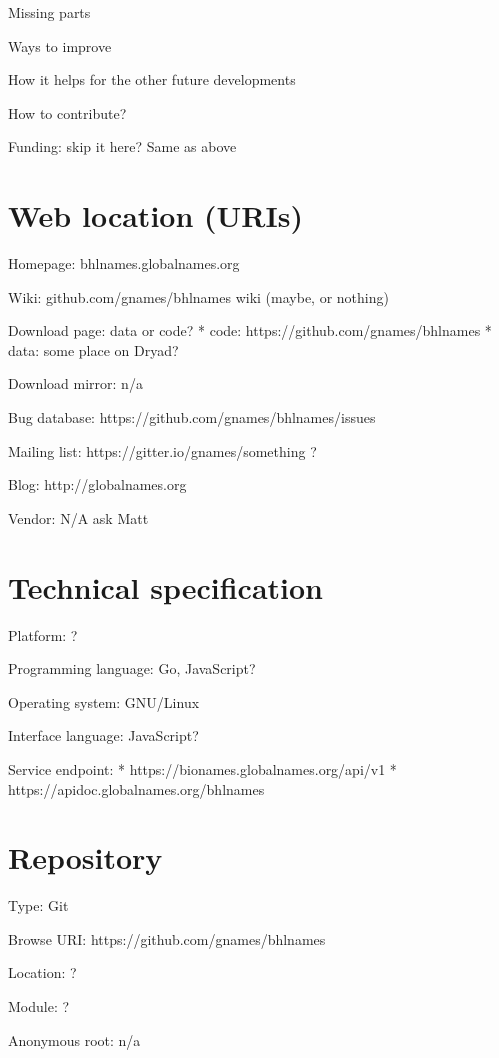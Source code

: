 \documentclass[
]{article}
\begin{document}
Missing parts

Ways to improve

How it helps for the other future developments

How to contribute?

Funding: skip it here? Same as above

\hypertarget{web-location-uris}{%
\section{Web location (URIs)}\label{web-location-uris}}

Homepage: bhlnames.globalnames.org

Wiki: github.com/gnames/bhlnames wiki (maybe, or nothing)

Download page: data or code? * code: https://github.com/gnames/bhlnames
* data: some place on Dryad?

Download mirror: n/a

Bug database: https://github.com/gnames/bhlnames/issues

Mailing list: https://gitter.io/gnames/something ?

Blog: http://globalnames.org

Vendor: N/A ask Matt

\hypertarget{technical-specification}{%
\section{Technical specification}\label{technical-specification}}

Platform: ?

Programming language: Go, JavaScript?

Operating system: GNU/Linux

Interface language: JavaScript?

Service endpoint: * https://bionames.globalnames.org/api/v1 *
https://apidoc.globalnames.org/bhlnames

\hypertarget{repository}{%
\section{Repository}\label{repository}}

Type: Git

Browse URI: https://github.com/gnames/bhlnames

Location: ?

Module: ?

Anonymous root: n/a
\end{document}
